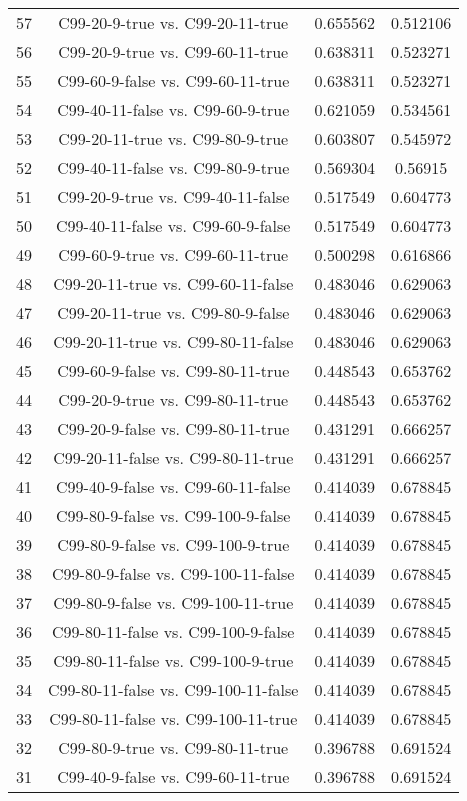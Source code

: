 \documentclass[a4paper,10pt]{article}
\begin{document}
\begin{landscape}
\begin{table}[!htp]
\begin{tabular}{cccc}
57&C99-20-9-true vs. C99-20-11-true&0.655562&0.512106\\
56&C99-20-9-true vs. C99-60-11-true&0.638311&0.523271\\
55&C99-60-9-false vs. C99-60-11-true&0.638311&0.523271\\
54&C99-40-11-false vs. C99-60-9-true&0.621059&0.534561\\
53&C99-20-11-true vs. C99-80-9-true&0.603807&0.545972\\
52&C99-40-11-false vs. C99-80-9-true&0.569304&0.56915\\
51&C99-20-9-true vs. C99-40-11-false&0.517549&0.604773\\
50&C99-40-11-false vs. C99-60-9-false&0.517549&0.604773\\
49&C99-60-9-true vs. C99-60-11-true&0.500298&0.616866\\
48&C99-20-11-true vs. C99-60-11-false&0.483046&0.629063\\
47&C99-20-11-true vs. C99-80-9-false&0.483046&0.629063\\
46&C99-20-11-true vs. C99-80-11-false&0.483046&0.629063\\
45&C99-60-9-false vs. C99-80-11-true&0.448543&0.653762\\
44&C99-20-9-true vs. C99-80-11-true&0.448543&0.653762\\
43&C99-20-9-false vs. C99-80-11-true&0.431291&0.666257\\
42&C99-20-11-false vs. C99-80-11-true&0.431291&0.666257\\
41&C99-40-9-false vs. C99-60-11-false&0.414039&0.678845\\
40&C99-80-9-false vs. C99-100-9-false&0.414039&0.678845\\
39&C99-80-9-false vs. C99-100-9-true&0.414039&0.678845\\
38&C99-80-9-false vs. C99-100-11-false&0.414039&0.678845\\
37&C99-80-9-false vs. C99-100-11-true&0.414039&0.678845\\
36&C99-80-11-false vs. C99-100-9-false&0.414039&0.678845\\
35&C99-80-11-false vs. C99-100-9-true&0.414039&0.678845\\
34&C99-80-11-false vs. C99-100-11-false&0.414039&0.678845\\
33&C99-80-11-false vs. C99-100-11-true&0.414039&0.678845\\
32&C99-80-9-true vs. C99-80-11-true&0.396788&0.691524\\
31&C99-40-9-false vs. C99-60-11-true&0.396788&0.691524\\

\end{tabular}
\end{table}
\end{landscape}
\end{document}
